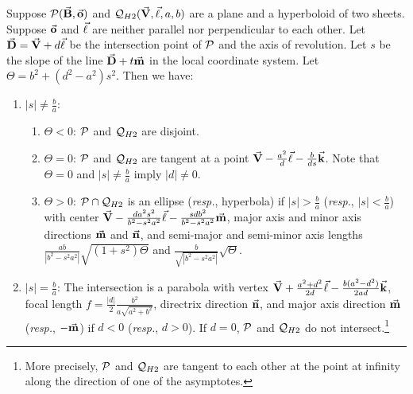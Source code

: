 \begin{theorem}
\label{thm:hy2-general}
     Suppose ${\cal P}(\vec{\bf B},\vec{\bf o})$ and
${\cal Q}_{H2}(\vec{\bf V},\vec{\bf \ell},a,b)$ are a plane and a hyperboloid of
two sheets. Suppose $\vec{\bf o}$ and $\vec{\bf \ell}$ are neither parallel nor
perpendicular to each other.  Let $\vec{\bf D}=\vec{\bf V}+d\vec{\bf \ell}$ be the
intersection point of ${\cal P}$ and the axis of revolution.
Let $s$ be the slope of the line $\vec{\bf D}+t\vec{\bf m}$ in the local coordinate
system.  Let $\Theta=b^2+(d^2-a^2)s^2$.  Then we have:
\begin{enumerate}
     \item $|s|\neq\frac{b}{a}$:
     \begin{enumerate}
          \item $\Theta<0$: ${\cal P}$ and ${\cal Q}_{H2}$ are disjoint.
          \item $\Theta=0$: ${\cal P}$ and ${\cal Q}_{H2}$ are tangent
               at a point $\vec{\bf V}-\frac{a^2}{d}\vec{\bf \ell}-\frac{b}{ds}
               \vec{\bf k}$.  Note that $\Theta=0$ and $|s|\neq\frac{b}{a}$
               imply $|d|\neq 0$.
          \item $\Theta>0$: ${\cal P}\cap{\cal Q}_{H2}$ is an ellipse
               ({\em resp.}, hyperbola) if $|s|>\frac{b}{a}$ ({\em resp.},
               $|s|<\frac{b}{a}$) with center
               $\vec{\bf V}-\frac{da^2s^2}{b^2-s^2a^2}\vec{\bf \ell}
                    -\frac{sdb^2}{b^2-s^2a^2}\vec{\bf m}$, major axis and minor
               axis directions $\vec{\bf m}$ and $\vec{\bf n}$, and semi-major
               and semi-minor axis lengths
               $\frac{ab}{|b^2-s^2a^2|}\sqrt{(1+s^2)\Theta}$ and
               $\frac{b}{\sqrt{|b^2-s^2a^2|}}\sqrt{\Theta}$.
     \end{enumerate}
     \item $|s|=\frac{b}{a}$:  The intersection is a parabola with vertex
          $\vec{\bf V}+\frac{a^2+d^2}{2d}\vec{\bf \ell}-
               \frac{b(a^2-d^2)}{2ad}\vec{\bf k}$, focal length
          $f=\frac{|d|}{2}\frac{b^2}{a\sqrt{a^2+b^2}}$, directrix direction
          $\vec{\bf n}$, and major axis direction $\vec{\bf m}$ ({\em resp.},
          $-\vec{\bf m}$) if $d<0$ ({\em resp.}, $d>0$).  If $d=0$, ${\cal P}$ and
          ${\cal Q}_{H2}$ do not intersect.\footnote{More precisely,
          ${\cal P}$ and ${\cal Q}_{H2}$ are tangent to each other at the point
          at infinity along the direction of one of the asymptotes.}
\end{enumerate}
\end{theorem}
